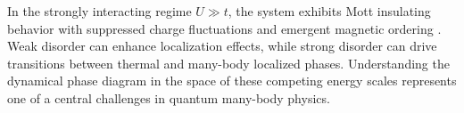 In the strongly interacting regime $U \gg t$, the system exhibits Mott insulating behavior with suppressed charge fluctuations and emergent magnetic ordering \cite{mazurenko_cold-atom_2017}. Weak disorder can enhance localization effects, while strong disorder can drive transitions between thermal and many-body localized phases. Understanding the dynamical phase diagram in the space of these competing energy scales represents one of a central challenges in quantum many-body physics.